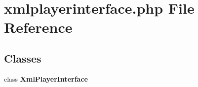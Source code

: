 \section{xmlplayerinterface.php File Reference}
\label{xmlplayerinterface_8php}


\subsection*{Classes}
\begin{CompactItemize}
\item 
class {\bf Xml\-Player\-Interface}
\end{CompactItemize}
